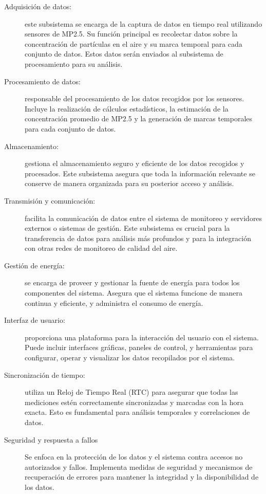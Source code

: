 \documentclass[
11pt, %
codirector, %
]{charter}
\begin{document}
\begin{description}
	\item[Adquisición de datos:] este subsistema se encarga de la captura de datos en tiempo real utilizando sensores de MP2.5. Su función principal es recolectar datos sobre la concentración de partículas en el aire y su marca temporal para cada conjunto de datos. Estos datos serán enviados al subsistema de procesamiento para su análisis.
	
	\item[Procesamiento de datos:] responsable del procesamiento de los datos recogidos por los sensores. Incluye la realización de cálculos estadísticos, la estimación de la concentración promedio de MP2.5 y la generación de marcas temporales para cada conjunto de datos.
	
	\item[Almacenamiento:] gestiona el almacenamiento seguro y eficiente de los datos recogidos y procesados. Este subsistema asegura que toda la información relevante se conserve de manera organizada para su posterior acceso y análisis.
	
	\item[Transmisión y comunicación:] facilita la comunicación de datos entre el sistema de monitoreo y servidores externos o sistemas de gestión. Este subsistema es crucial para la transferencia de datos para análisis más profundos y para la integración con otras redes de monitoreo de calidad del aire.
	
	\item[Gestión de energía:] se encarga de proveer y gestionar la fuente de energía para todos los componentes del sistema. Asegura que el sistema funcione de manera continua y eficiente, y administra el consumo de energía.
	
	\item[Interfaz de usuario:] proporciona una plataforma para la interacción del usuario con el sistema. Puede incluir interfaces gráficas, paneles de control, y herramientas para configurar, operar y visualizar los datos recopilados por el sistema.
	
	\item[Sincronización de tiempo:] utiliza un Reloj de Tiempo Real (RTC) para asegurar que todas las mediciones estén correctamente sincronizadas y marcadas con la hora exacta. Esto es fundamental para análisis temporales y correlaciones de datos.
	
	\item[Seguridad y respuesta a fallos] Se enfoca en la protección de los datos y el sistema contra accesos no autorizados y fallos. Implementa medidas de seguridad y mecanismos de recuperación de errores para mantener la integridad y la disponibilidad de los datos.
\end{description}
\end{document}
